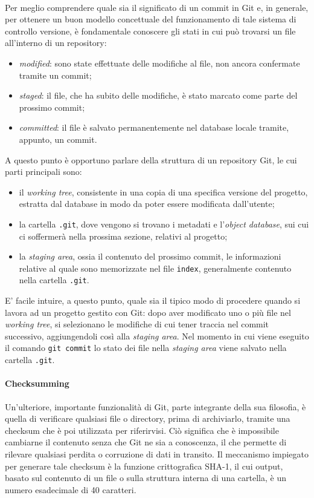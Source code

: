 \documentclass[12pt]{article}
\def\code#1{\texttt{#1}}
\begin{document}
\bigskip \\
Per meglio comprendere quale sia il significato di un commit in Git e, in generale, per ottenere un buon modello concettuale del funzionamento di tale sistema di controllo versione, è fondamentale conoscere gli stati in cui può trovarsi un file all'interno di un repository:
\begin{itemize}
	\item \textit{modified}: sono state effettuate delle modifiche al file, non ancora confermate tramite un commit;
	\item \textit{staged}: il file, che ha subito delle modifiche, è stato marcato come parte del prossimo commit;
	\item \textit{committed}: il file è salvato permanentemente nel database locale tramite, appunto, un commit.
\end{itemize}
A questo punto è opportuno parlare della struttura di un repository Git, le cui parti principali sono:
\begin{itemize}
	\item il \textit{working tree}, consistente in una copia di una specifica versione del progetto, estratta dal database in modo da poter essere modificata dall'utente;
	\item la cartella \code{.git}, dove vengono si trovano i metadati e l'\textit{object database}, sui cui ci soffermerà nella prossima sezione, relativi al progetto;
	\item la \textit{staging area}, ossia il contenuto del prossimo commit, le informazioni relative al quale sono memorizzate nel file \code{index}, generalmente contenuto nella cartella \code{.git}. 
\end{itemize}
E' facile intuire, a questo punto, quale sia il tipico modo di procedere quando si lavora ad un progetto gestito con Git: dopo aver modificato uno o più file nel \textit{working tree}, si selezionano le modifiche di cui tener traccia nel commit successivo, aggiungendoli così alla \textit{staging area}. Nel momento in cui viene eseguito il comando \code{git commit} lo stato dei file nella \textit{staging area} viene salvato nella cartella \code{.git}.
\paragraph{Checksumming}
Un'ulteriore, importante funzionalità di Git, parte integrante della sua filosofia, è quella di verificare qualsiasi file o directory, prima di archiviarlo, tramite una checksum che è poi utilizzata per riferirvisi. Ciò significa che è impossibile cambiarne il contenuto senza che Git ne sia a conoscenza, il che permette di rilevare qualsiasi perdita o corruzione di dati in transito. 
Il meccanismo impiegato per generare tale checksum è la funzione crittografica SHA-1, il cui output, basato sul contenuto di un file o sulla struttura interna di una cartella, è un numero esadecimale di 40 caratteri.
\end{document}
